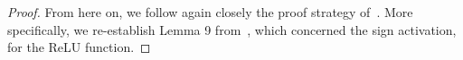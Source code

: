 \begin{proof}
 
 





From here on, we follow again closely the proof strategy
of~\cite{grohewl}. More specifically, we re-establish Lemma 9 from~\cite{grohewl}, which concerned the sign activation, for the ReLU function.
  

\end{proof}
